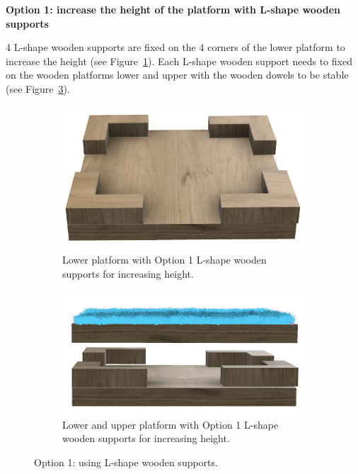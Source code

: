 {\pagebreak

{\bfseries Option 1: increase the height of the platform with L-shape wooden
           supports}

\headlinebox

4 L-shape wooden supports are fixed on the 4 corners of the lower platform to
increase the height (see Figure~\ref{fig:parkour-option1-lower}).
Each L-shape wooden support needs to fixed on the wooden platforms lower and
upper with the wooden dowels to be stable
(see Figure~\ref{fig:parkour-option1-full}). 

\begin{figure}[htb]
  \begin{subfigure}{.45\textwidth}
    \centering
    \includegraphics[width=\textwidth]{img/parkour/option1_lower}
    \caption{Lower platform with Option 1 L-shape wooden supports for increasing
             height.}
    \label{fig:parkour-option1-lower}
  \end{subfigure}
  \hfill
  \begin{subfigure}{.45\textwidth}
    \centering
    \includegraphics[width=\textwidth]{img/parkour/option1_full}
    \caption{Lower and upper platform with Option 1 L-shape wooden supports
             for increasing height.}
    \label{fig:parkour-option1-full}
  \end{subfigure}
  \caption{Option 1: using L-shape wooden supports.}
\end{figure}

}
